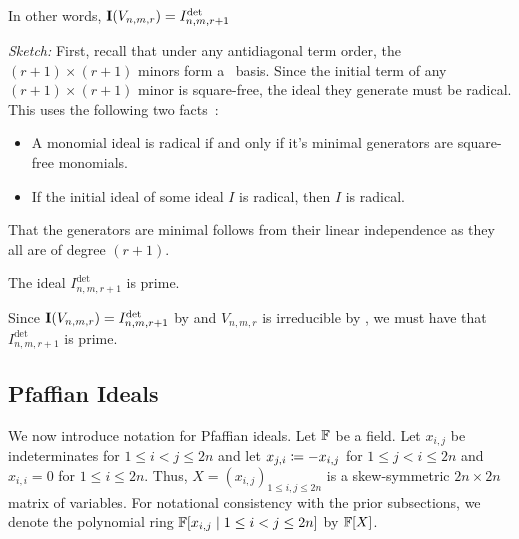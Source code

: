 \documentclass[letterpaper, 11pt]{amsart}
\newif\iffull
\begin{document}
\begin{prop}\label{prop:ideal_det_variety_radical}
  In other words, $\operatorname{\mathbf{I}}(V_{n, m , r}) = I^{\det}_{n, m, r + 1}$
\end{prop}
\begin{pf}
  \emph{Sketch:} First, recall that under any antidiagonal term order, the $(r + 1) \times (r + 1)$ minors form a \Grobner\ basis.
  Since the initial term of any $(r + 1) \times (r + 1)$ minor is square-free, the ideal they generate must be radical.
  This uses the following two facts~\cite[Chapter 4, \S 2, Exercise 17]{CLO25}:
  \begin{itemize}
    \item A monomial ideal is radical if and only if it's minimal generators are square-free monomials.
    \item If the initial ideal of some ideal $I$ is radical, then $I$ is radical.
  \end{itemize}
  That the generators are minimal follows from their linear independence as they all are of degree $(r + 1)$.
\end{pf}

\begin{cor}\label{cor:ideal_det_variety_prime}
  The ideal $I^{\det}_{n, m, r + 1}$ is prime.
\end{cor}
\begin{pf}
  Since $\operatorname{\mathbf{I}}(V_{n, m , r}) = I^{\det}_{n, m, r + 1}$ by  and $V_{n, m, r}$ is irreducible by , we must have that $I^{\det}_{n, m, r + 1}$ is prime.
\end{pf}

\fi

\iffull
\subsection{Pfaffian Ideals}

We now introduce notation for Pfaffian ideals.
Let $\mathbb{F}$ be a field.
Let $x_{i, j}$ be indeterminates for $1 \leq i < j \leq 2n$ and let $x_{j, i} \coloneqq -x_{i, j}$ for $1 \leq j < i \leq 2n$ and $x_{i, i} = 0$ for $1 \leq i \leq 2n$.
Thus, $X = (x_{i, j})_{1 \leq i, j \leq 2n}$ is a skew-symmetric $2n \times 2n$ matrix of variables.
For notational consistency with the prior subsections, we denote the polynomial ring $\mathbb{F}[x_{i, j} \mid 1 \leq i < j \leq 2n]$ by $\mathbb{F}[X]$.
\end{document}
